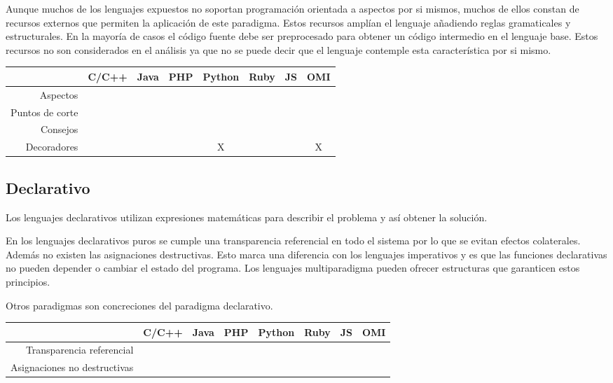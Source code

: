 Aunque muchos de los lenguajes expuestos no soportan programación orientada a aspectos
por si mismos, muchos de ellos constan de recursos externos que permiten 
la aplicación de este paradigma. Estos recursos amplían el lenguaje 
añadiendo reglas gramaticales y estructurales. En la mayoría de casos 
el código fuente debe ser preprocesado para obtener un código intermedio
en el lenguaje base. Estos recursos no son considerados en el análisis 
ya que no se puede decir que el lenguaje contemple esta característica por si mismo.

\FloatBarrier
\begin{table}[h]
\begin{center}
 
\begin{tabular}{|r|c|c|c|c|c|c|c|} \hline
 & C/C++ & Java & PHP  & Python & Ruby & JS & OMI\\ \hline
Aspectos & & &  &  &  &  &  \\ \hline
Puntos de corte & & & &  &  &  &  \\ \hline
Consejos   & & & & & & &  \\ \hline
Decoradores   & & & & X & & & X \\ \hline
\end{tabular}
\end{center}
\end{table}
\FloatBarrier

\subsection {Declarativo}
Los lenguajes declarativos utilizan expresiones matemáticas para describir el problema y así obtener la solución.  

En los lenguajes declarativos puros se cumple una transparencia referencial en todo el sistema por lo
que se evitan efectos colaterales. Además no existen las asignaciones destructivas. Esto marca una diferencia 
con los lenguajes imperativos y es que las funciones declarativas no pueden depender o cambiar el estado del 
programa. Los lenguajes multiparadigma pueden ofrecer estructuras que garanticen estos principios.

Otros paradigmas son concreciones del paradigma declarativo.

\FloatBarrier
\begin{table}[h]
\begin{center}
\begin{tabular}{|r|c|c|c|c|c|c|c|} \hline
 & C/C++ & Java & PHP  & Python & Ruby & JS & OMI\\ \hline
Transparencia referencial & & &  &  &  &  &  \\ \hline
Asignaciones no destructivas & & &  &  &  &  &  \\ \hline
\end{tabular}
\end{center}
\end{table}
\FloatBarrier

